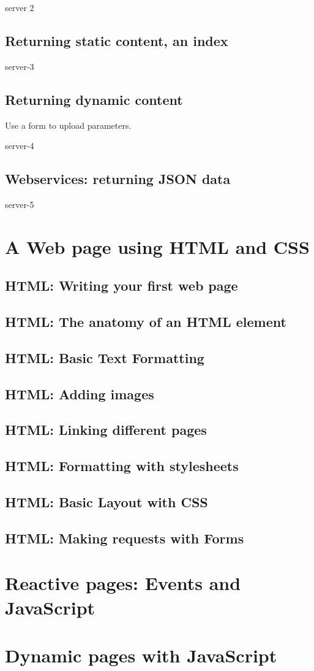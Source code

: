 \documentclass[12pt,a5paper]{memoir}
\begin{document}
server 2


\chapter{Returning static content, an index}
  
server-3

\chapter{Returning dynamic content}

Use a form to upload parameters.

server-4

\chapter{Webservices: returning JSON data}

server-5

\part{A Web page using HTML and CSS}

\chapter{HTML: Writing your first web page}

\chapter{HTML: The anatomy of an HTML element}

\chapter{HTML: Basic Text Formatting}

\chapter{HTML: Adding images}

\chapter{HTML: Linking different pages}

\chapter{HTML: Formatting with stylesheets}

\chapter{HTML: Basic Layout with CSS}

\chapter{HTML: Making requests with Forms}

\part{Reactive pages: Events and JavaScript}

\part{Dynamic pages with JavaScript}
\end{document}
